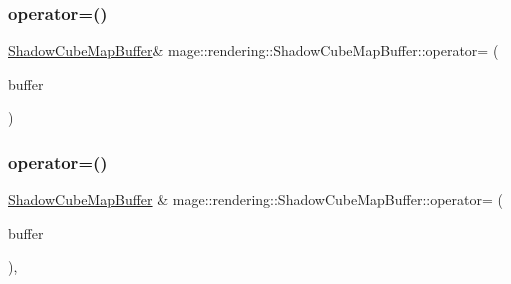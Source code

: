\mbox{\label{classmage_1_1rendering_1_1_shadow_cube_map_buffer_a25b59803df1595c97b452dd91c661854}} 
\subsubsection{\texorpdfstring{operator=()}{operator=()}\hspace{0.1cm}{\footnotesize\ttfamily [1/2]}}
{\footnotesize\ttfamily \mbox{\hyperlink{classmage_1_1rendering_1_1_shadow_cube_map_buffer}{Shadow\+Cube\+Map\+Buffer}}\& mage\+::rendering\+::\+Shadow\+Cube\+Map\+Buffer\+::operator= (\begin{DoxyParamCaption}\item[{const \mbox{\hyperlink{classmage_1_1rendering_1_1_shadow_cube_map_buffer}{Shadow\+Cube\+Map\+Buffer}} \&}]{buffer }\end{DoxyParamCaption})\hspace{0.3cm}{\ttfamily [delete]}}

\mbox{\label{classmage_1_1rendering_1_1_shadow_cube_map_buffer_a5eb775fdc0f94c220b0115f2695ef18b}} 
\subsubsection{\texorpdfstring{operator=()}{operator=()}\hspace{0.1cm}{\footnotesize\ttfamily [2/2]}}
{\footnotesize\ttfamily \mbox{\hyperlink{classmage_1_1rendering_1_1_shadow_cube_map_buffer}{Shadow\+Cube\+Map\+Buffer}} \& mage\+::rendering\+::\+Shadow\+Cube\+Map\+Buffer\+::operator= (\begin{DoxyParamCaption}\item[{\mbox{\hyperlink{classmage_1_1rendering_1_1_shadow_cube_map_buffer}{Shadow\+Cube\+Map\+Buffer}} \&\&}]{buffer }\end{DoxyParamCaption})\hspace{0.3cm}{\ttfamily [default]}, {\ttfamily [noexcept]}}

